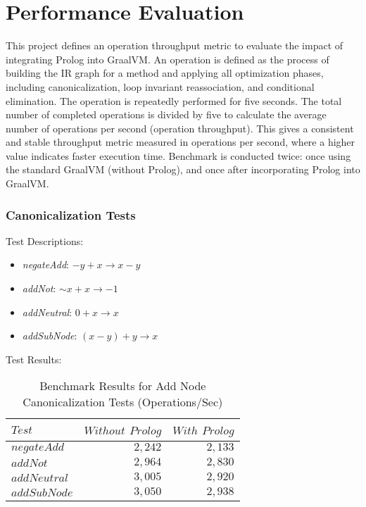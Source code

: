 \renewcommand{\arraystretch}{1.3} %
\setlength{\tabcolsep}{10pt}      %

\chapter[Performance Evaluation]{Performance Evaluation}
This project defines an operation throughput metric to evaluate the impact of integrating Prolog into GraalVM. An operation is defined as the process of building the IR graph for a method and applying all optimization phases, including canonicalization, loop invariant reassociation, and conditional elimination. The operation is repeatedly performed for five seconds. The total number of completed operations is divided by five to calculate the average number of operations per second (operation throughput). This gives a consistent and stable throughput metric measured in operations per second, where a higher value indicates faster execution time. Benchmark is conducted twice: once using the standard GraalVM (without Prolog), and once after incorporating Prolog into GraalVM.
\subsection*{Canonicalization Tests}

Test Descriptions:
\begin{itemize}
    \item \textit{negateAdd}: $-y + x \rightarrow x - y$
    \item \textit{addNot}: $\sim x + x \rightarrow -1$
    \item \textit{addNeutral}: $0 + x \rightarrow x$
    \item \textit{addSubNode}: $(x - y) + y \rightarrow x$
\end{itemize}

Test Results:
\begin{table}[h]
    \centering
    \begin{tabular}{|l|r|r|}
        \hline
        $Test$ & $Without$ $Prolog$ & $With$ $Prolog$ \\
        \hline
        $negateAdd$   & $2,242$ & $2,133$ \\
        $addNot$      & $2,964$ & $2,830$ \\
        $addNeutral$  & $3,005$ & $2,920$ \\
        $addSubNode$  & $3,050$ & $2,938$ \\
        \hline
    \end{tabular}
    \caption{Benchmark Results for Add Node Canonicalization Tests (Operations/Sec)}
    \label{table:Canonicalization}
\end{table}

